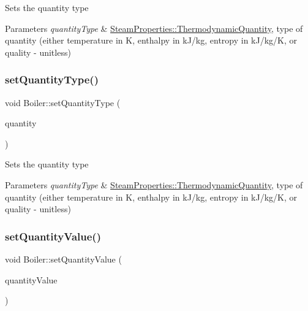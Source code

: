 Sets the quantity type 
\begin{DoxyParams}{Parameters}
{\em quantity\+Type} & \hyperlink{class_steam_properties_ae0294bedf7d178c2d8fb6aed0f62fbff}{Steam\+Properties\+::\+Thermodynamic\+Quantity}, type of quantity (either temperature in K, enthalpy in k\+J/kg, entropy in k\+J/kg/K, or quality -\/ unitless) \\
\hline
\end{DoxyParams}
\mbox{\label{class_boiler_a9c5b20cae6133c9174b12760f36d52c2}} 
\subsubsection{\texorpdfstring{set\+Quantity\+Type()}{setQuantityType()}\hspace{0.1cm}{\footnotesize\ttfamily [3/3]}}
{\footnotesize\ttfamily void Boiler\+::set\+Quantity\+Type (\begin{DoxyParamCaption}\item[{\hyperlink{class_steam_properties_ae0294bedf7d178c2d8fb6aed0f62fbff}{Steam\+Properties\+::\+Thermodynamic\+Quantity}}]{quantity }\end{DoxyParamCaption})}

Sets the quantity type 
\begin{DoxyParams}{Parameters}
{\em quantity\+Type} & \hyperlink{class_steam_properties_ae0294bedf7d178c2d8fb6aed0f62fbff}{Steam\+Properties\+::\+Thermodynamic\+Quantity}, type of quantity (either temperature in K, enthalpy in k\+J/kg, entropy in k\+J/kg/K, or quality -\/ unitless) \\
\hline
\end{DoxyParams}
\mbox{\label{class_boiler_ac3450d88dba124529d59baf62c39e14a}} 
\subsubsection{\texorpdfstring{set\+Quantity\+Value()}{setQuantityValue()}\hspace{0.1cm}{\footnotesize\ttfamily [1/3]}}
{\footnotesize\ttfamily void Boiler\+::set\+Quantity\+Value (\begin{DoxyParamCaption}\item[{double}]{quantity\+Value }\end{DoxyParamCaption})}

